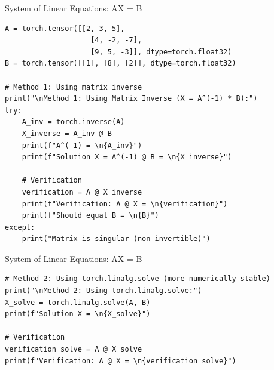 \documentclass[aspectratio=169,xcolor=dvipsnames,svgnames,x11names,fleqn]{beamer}
\begin{document}
\begin{frame}[containsverbatim]{System of Linear Equations: AX = B}
\begin{verbatim}
A = torch.tensor([[2, 3, 5], 
                    [4, -2, -7], 
                    [9, 5, -3]], dtype=torch.float32)
B = torch.tensor([[1], [8], [2]], dtype=torch.float32)

# Method 1: Using matrix inverse
print("\nMethod 1: Using Matrix Inverse (X = A^(-1) * B):")
try:
    A_inv = torch.inverse(A)
    X_inverse = A_inv @ B
    print(f"A^(-1) = \n{A_inv}")
    print(f"Solution X = A^(-1) @ B = \n{X_inverse}")
    
    # Verification
    verification = A @ X_inverse
    print(f"Verification: A @ X = \n{verification}")
    print(f"Should equal B = \n{B}")
except:
    print("Matrix is singular (non-invertible)")

\end{verbatim}
\end{frame}



\begin{frame}[containsverbatim]{System of Linear Equations: AX = B}
\begin{verbatim}
# Method 2: Using torch.linalg.solve (more numerically stable)
print("\nMethod 2: Using torch.linalg.solve:")
X_solve = torch.linalg.solve(A, B)
print(f"Solution X = \n{X_solve}")

# Verification
verification_solve = A @ X_solve
print(f"Verification: A @ X = \n{verification_solve}")

\end{verbatim}
\end{frame}
\end{document}
